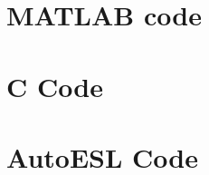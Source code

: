 \section{MATLAB code}
\label{apdx:sourceCode:matlab}


\section{C Code}
\label{apdx:sourceCode:c}


\section{AutoESL Code}
\label{apdx:sourceCode:autoesl}


